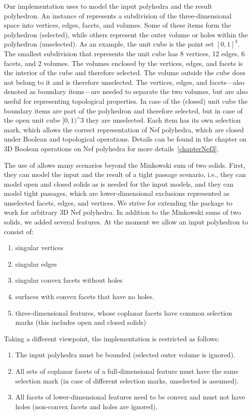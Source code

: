 Our implementation uses  to model the input
polyhedra and the result polyhedron. An instance of
 represents a subdivision of the
three-dimensional space into vertices, edges, facets, and
volumes. Some of these items form the polyhedron (selected), while
others represent the outer volume or holes within the polyhedron
(unselected). As an example, the unit cube is the point set
$[0,1]^3$. The smallest subdivision that represents the unit cube has
8 vertices, 12 edges, 6 facets, and 2 volumes. The volumes enclosed by
the vertices, edges, and facets is the interior of the cube and
therefore selected. The volume outside the cube does not belong to it
and is therefore unselected. The vertices, edges, and facets---also
denoted as boundary items---are needed to separate the two volumes,
but are also useful for representing topological properties. In case
of the (closed) unit cube the boundary items are part of the
polyhedron and therefore selected, but in case of the open unit cube
$[0,1)$^3 they are unselected. Each item has its own selection mark,
which allows the correct representation of Nef polyhedra, which are
closed under Boolean and topological operations. Details can be found
in the chapter on 3D Boolean operations on Nef polyhedra for more
details~\ref{chapterNef3}.

The use of  allows many scenarios beyond the
Minkowski sum of two solids. First, they can model the input and the
result of a tight passage scenario, i.e., they can model open and
closed solids as is needed for the input models, and they can model
tight passages, which are lower-dimensional exclusions represented as
unselected facets, edges, and vertices. We strive for extending the
package to work for arbitrary 3D Nef polyhedra. In addition to the
Minkowski sums of two solids, we added several features. At the moment
we allow an input polyhedron to consist of:
\begin{enumerate}
\item singular vertices
\item singular edges
\item singular convex facets without holes
\item surfaces with convex facets that have no holes.
\item three-dimensional features, whose coplanar facets have
common selection marks (this includes open and closed solids)
\end{enumerate}

Taking a different viewpoint, the implementation is restricted as
follows:
\begin{enumerate}
\item The input polyhedra must be bounded (selected outer volume is ignored).
\item All sets of coplanar facets of a full-dimensional
feature must have the same selection mark (in case of different
selection marks, unselected is assumed).
\item All facets of lower-dimensional features need to be convex and 
must not have holes (non-convex facets and holes are ignored).
\end{enumerate}

